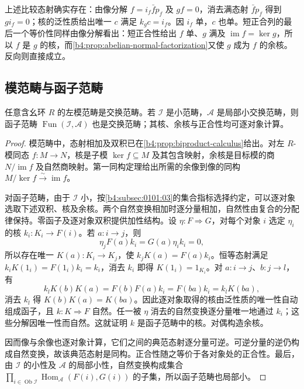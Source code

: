 上述比较态射确实存在：由像分解 \(f=i_f\bar f p_f\) 及 \(gf=0\)，消去满态射 \(\bar f p_f\) 得到 \(gi_f=0\)；核的泛性质给出唯一 \(c\) 满足 \(k_gc=i_f\)。因 \(i_f\) 单，\(c\) 也单。短正合列的最后一个等价性同样由像分解看出：短正合性给出 \(f\) 单、\(g\) 满及 \(\operatorname{im}f=\ker g\)，所以 \(f\) 是 \(g\) 的核，而\cref{b4:prop:abelian-normal-factorization}又使 \(g\) 成为 \(f\) 的余核。反向则直接成立。

\subsection{模范畴与函子范畴}
\label{b4:subsec:0402:02}

\begin{proposition}\label{b4:prop:module-functor-abelian}
	任意含幺环 \(R\) 的左模范畴是交换范畴。若 \(\mathcal I\) 是小范畴，\(\mathcal A\) 是局部小交换范畴，则函子范畴 \(\operatorname{Fun}(\mathcal I,\mathcal A)\) 也是交换范畴；其核、余核与正合性均可逐对象计算。
\end{proposition}
\begin{proof}
	模范畴中，态射相加及双积已在\cref{b4:prop:biproduct-calculus}给出。对左 \(R\)-模同态 \(f:M\to N\)，核是子模 \(\ker f\subseteq M\) 及其包含映射，余核是目标模的商 \(N/\operatorname{im}f\) 及自然商映射。第一同构定理给出所需的余像到像的同构 \(M/\ker f\xrightarrow{\sim}\operatorname{im}f\)。

	对函子范畴，由于 \(\mathcal I\) 小，按\cref{b4:subsec:0101:03}的集合指标选择约定，可以逐对象选取下述双积、核及余核。两个自然变换相加时逐分量相加，自然性由复合的分配律保持。零函子及逐对象双积提供加性结构。设 \(\eta:F\Rightarrow G\)，对每个对象 \(i\) 选定 \(\eta_i\) 的核 \(k_i:K_i\to F(i)\)。若 \(a:i\to j\)，则
	\[
		\eta_jF(a)k_i=G(a)\eta_i k_i=0,
	\]
	所以存在唯一 \(K(a):K_i\to K_j\)，使 \(k_jK(a)=F(a)k_i\)。恒等态射满足 \(k_iK(1_i)=F(1_i)k_i=k_i\)，消去 \(k_i\) 即得 \(K(1_i)=1_{K_i}\)。对 \(a:i\to j\)、\(b:j\to l\)，有
	\[
		k_lK(b)K(a)=F(b)F(a)k_i=F(ba)k_i=k_lK(ba),
	\]
	消去 \(k_l\) 得 \(K(b)K(a)=K(ba)\)。因此逐对象取得的核由泛性质的唯一性自动组成函子，且 \(k:K\Rightarrow F\) 自然。任一被 \(\eta\) 消去的自然变换逐分量唯一地通过 \(k_i\)；这些分解因唯一性而自然。这就证明 \(k\) 是函子范畴中的核。对偶构造余核。

	因而像与余像也逐对象计算，它们之间的典范态射逐分量可逆。可逆分量的逆仍构成自然变换，故该典范态射是同构。正合性随之等价于各对象处的正合性。最后，由 \(\mathcal I\) 的小性及 \(\mathcal A\) 的局部小性，自然变换构成集合 \(\prod_{i\in\operatorname{Ob}\mathcal I}\operatorname{Hom}_{\mathcal A}(F(i),G(i))\) 的子集，所以函子范畴也局部小。
\end{proof}

